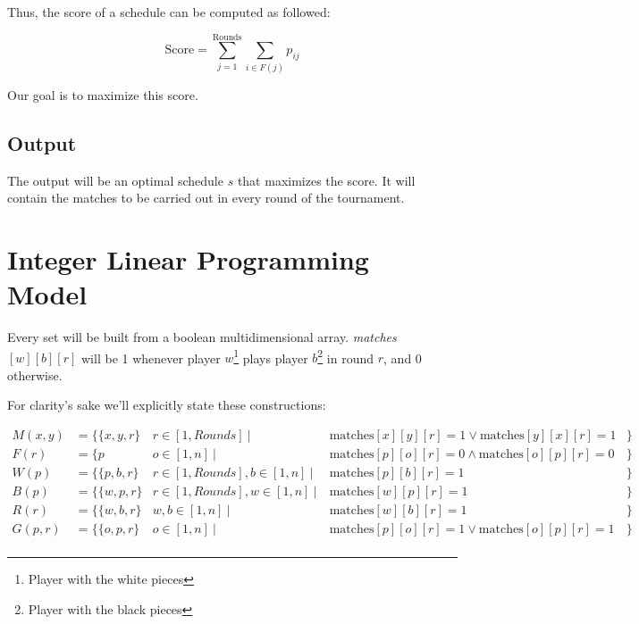 \documentclass[a4paper, 10pt]{article}
\begin{document}
Thus, the score of a schedule can be computed as followed:

\begin{equation}
    \text{Score} = \sum_{j = 1}^{\text{Rounds}} \sum_{i \in F(j)}  p_{ij}
    \label{objfunc}
\end{equation}


Our goal is to maximize this score.






\subsection{Output}
The output will be an optimal schedule $s$ that maximizes the score. It will contain the matches to be carried out in every round of the tournament.

\clearpage

\section{Integer Linear Programming Model}
Every set will be built from a boolean multidimensional array. \textit{matches}$[w][b][r]$ will be 1 whenever player $w$\footnote{Player with the white pieces} plays player $b$\footnote{Player with the black pieces} in round $r$, and 0 otherwise.


For clarity's sake we'll explicitly state these constructions:

\begin{align*}
    M(x, y)   &= \{\{x, y, r\} &r \in [1, Rounds]              \ |& \ \text{matches}[x][y][r] = 1 \lor \text{matches}[y][x][r] = 1  &\}\\
    F(r)      &= \{p           &o \in [1, n]                   \ |& \ \text{matches}[p][o][r] = 0 \land \text{matches}[o][p][r] = 0 &\}\\
    W(p)      &= \{\{p, b, r\} &r \in [1, Rounds], b \in [1, n]\ |& \ \text{matches}[p][b][r] = 1                                   &\}\\
    B(p)      &= \{\{w, p, r\} &r \in [1, Rounds], w \in [1, n]\ |& \ \text{matches}[w][p][r] = 1                                   &\}\\
    R(r)      &= \{\{w, b, r\} &w, b \in [1, n]                \ |& \ \text{matches}[w][b][r] = 1                                   &\}\\
    G(p, r)   &= \{\{o, p, r\} &o \in [1, n]                   \ |& \ \text{matches}[p][o][r] = 1  \lor \text{matches}[o][p][r] = 1 &\}\\
\end{align*}
\end{document}
